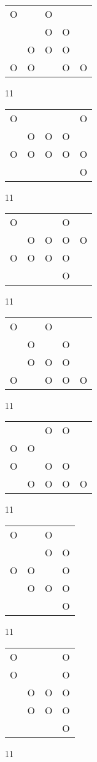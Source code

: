 \begin{tabular}{|m{0.2cm}m{0.2cm}m{0.2cm}m{0.2cm}m{0.2cm}|}\hline
O& &O& & \\
 & &O&O& \\
 &O&O&O& \\
O&O& &O&O\\
\hline\end{tabular}11
\begin{tabular}{|m{0.2cm}m{0.2cm}m{0.2cm}m{0.2cm}m{0.2cm}|}\hline
O& & & &O\\
 &O&O&O& \\
O&O&O&O&O\\
 & & & &O\\
\hline\end{tabular}11
\begin{tabular}{|m{0.2cm}m{0.2cm}m{0.2cm}m{0.2cm}m{0.2cm}|}\hline
O& & &O& \\
 &O&O&O&O\\
O&O&O&O& \\
 & & &O& \\
\hline\end{tabular}11
\begin{tabular}{|m{0.2cm}m{0.2cm}m{0.2cm}m{0.2cm}m{0.2cm}|}\hline
O& &O& & \\
 &O& &O& \\
 &O&O&O& \\
O& &O&O&O\\
\hline\end{tabular}11
\begin{tabular}{|m{0.2cm}m{0.2cm}m{0.2cm}m{0.2cm}m{0.2cm}|}\hline
 & &O&O& \\
O&O& & & \\
O& &O&O& \\
 &O&O&O&O\\
\hline\end{tabular}11
\begin{tabular}{|m{0.2cm}m{0.2cm}m{0.2cm}m{0.2cm}|}\hline
O& &O& \\
 & &O&O\\
O&O& &O\\
 &O&O&O\\
 & & &O\\
\hline\end{tabular}11
\begin{tabular}{|m{0.2cm}m{0.2cm}m{0.2cm}m{0.2cm}|}\hline
O& & &O\\
O& & &O\\
 &O&O&O\\
 &O&O&O\\
 & & &O\\
\hline\end{tabular}11

